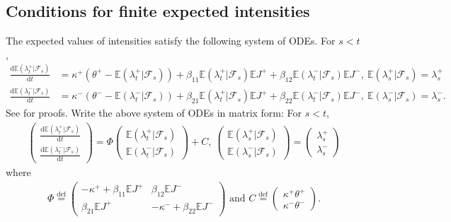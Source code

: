 \documentclass[11pt,a4paper]{article}
\numberwithin{equation}{section}
\theoremstyle{remark}
\theoremstyle{definition}
\newcommand{\E}{{\mathbb{E}}}
\begin{document}
\subsection{Conditions for finite expected intensities}\label{sec:finite_expected_intensities}
The expected values of intensities satisfy the following system of ODEs.
For $s<t$,
\begin{align*}
\frac{\text{d}\E(\lambda^+_t|\mathcal{F}_s)}{\text{d}t} &= \kappa^+(\theta^+ - \E(\lambda^+_t|\mathcal{F}_s)) + \beta_{11}\E(\lambda^+_t|\mathcal{F}_s)\E J^+
+ \beta_{12}\E(\lambda^-_t|\mathcal{F}_s)\E J^-,\ \E(\lambda^+_s|\mathcal{F}_s)=\lambda^+_s\\
\frac{\text{d}\E(\lambda^-_t|\mathcal{F}_s)}{\text{d}t} &= \kappa^-(\theta^- - \E(\lambda^-_t|\mathcal{F}_s)) + \beta_{21}\E(\lambda^+_t|\mathcal{F}_s)\E J^+
+ \beta_{22}\E(\lambda^-_t|\mathcal{F}_s)\E J^-,\ \E(\lambda^-_s|\mathcal{F}_s)=\lambda^-_s.
\end{align*}
See \cite{Errais2010} for proofs.
Write the above system of ODEs in matrix form:
For $s<t$,
\begin{align}
\begin{pmatrix}
  \frac{\text{d}\E(\lambda^+_t|\mathcal{F}_s)}{\text{d}t} \\
  \frac{\text{d}\E(\lambda^-_t|\mathcal{F}_s)}{\text{d}t}
\end{pmatrix}
= \Phi \begin{pmatrix}
  \E(\lambda^+_t|\mathcal{F}_s)\\
  \E(\lambda^-_t|\mathcal{F}_s)
\end{pmatrix} +C,\
\begin{pmatrix}
  \E(\lambda^+_s|\mathcal{F}_s)\\
\E(\lambda^-_s|\mathcal{F}_s)
\end{pmatrix}=
\begin{pmatrix}
\lambda^+_s\\
\lambda^-_s
\end{pmatrix}
\label{eq:lambda_ODEs}
\end{align}
where
\begin{align*}
\Phi \overset{\text{def}}=
\begin{pmatrix}
-\kappa^+ + \beta_{11}\E J^+ & \beta_{12}\E J^- \\
 \beta_{21}\E J^+ & -\kappa^- + \beta_{22}\E J^-
\end{pmatrix} \text{ and }
C \overset{\text{def}}=
\begin{pmatrix}
\kappa^+\theta^+ \\
\kappa^-\theta^-
  \end{pmatrix}.
\end{align*}
\end{document}
